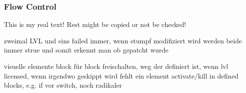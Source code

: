 \subsubsection{Flow Control} \label{subsection:counter-improve-tampering-flow}
This is my real text! Rest might be copied or not be checked!


zweimal LVL und eins failed immer, wenn stumpf modifiziert wird werden beide immer strue und somit erkennt man ob gepatcht wurde

visuelle elemente block für block freischalten, weg der definiert ist, wenn lvl licensed, wenn irgendwo geskippt wird fehlt ein element
activate/kill in defined blocks, e.g. if vor switch, noch radikaler
